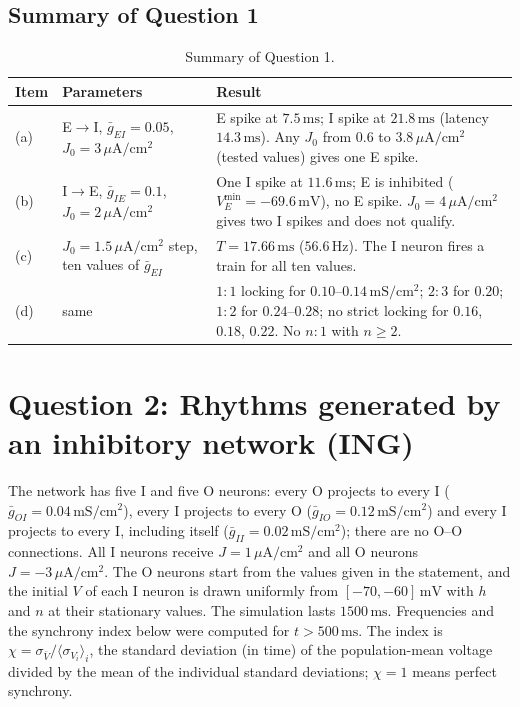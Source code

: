 \documentclass[12pt]{article}
\newcommand{\ms}{\,\mathrm{ms}}
\newcommand{\mV}{\,\mathrm{mV}}
\newcommand{\Hz}{\,\mathrm{Hz}}
\newcommand{\gu}{\,\mathrm{mS/cm^2}}
\newcommand{\Ju}{\,\mu\mathrm{A/cm^2}}
\begin{document}
\subsection*{Summary of Question 1}

\begin{table}[H]
\centering
\begin{tabular}{p{}p{}p{}}
\toprule
\textbf{Item} & \textbf{Parameters} & \textbf{Result}\\
\midrule
(a) & E$\to$I, $\bar g_{EI}=0.05$, $J_0=3\Ju$ & E spike at $7.5\ms$; I spike at $21.8\ms$ (latency $14.3\ms$). Any $J_0$ from $0.6$ to $3.8\Ju$ (tested values) gives one E spike.\\
(b) & I$\to$E, $\bar g_{IE}=0.1$, $J_0=2\Ju$ & One I spike at $11.6\ms$; E is inhibited ($V_E^{\min}=-69.6\mV$), no E spike. $J_0=4\Ju$ gives two I spikes and does not qualify.\\
(c) & $J_0=1.5\Ju$ step, ten values of $\bar g_{EI}$ & $T=17.66\ms$ ($56.6\Hz$). The I neuron fires a train for all ten values.\\
(d) & same & $1{:}1$ locking for $0.10$--$0.14\gu$; $2{:}3$ for $0.20$; $1{:}2$ for $0.24$--$0.28$; no strict locking for $0.16$, $0.18$, $0.22$. No $n{:}1$ with $n\ge2$.\\
\bottomrule
\end{tabular}
\caption{Summary of Question 1.}
\label{tab:q1summary}
\end{table}

\section*{Question 2: Rhythms generated by an inhibitory network (ING)}

The network has five I and five O neurons: every O projects to every I ($\bar g_{OI}=0.04\gu$), every I projects to every O ($\bar g_{IO}=0.12\gu$) and every I projects to every I, including itself ($\bar g_{II}=0.02\gu$); there are no O--O connections. All I neurons receive $J=1\Ju$ and all O neurons $J=-3\Ju$. The O neurons start from the values given in the statement, and the initial $V$ of each I neuron is drawn uniformly from $[-70,-60]\mV$ with $h$ and $n$ at their stationary values. The simulation lasts $1500\ms$. Frequencies and the synchrony index below were computed for $t>500\ms$. The index is $\chi=\sigma_{\bar V}/\langle\sigma_{V_i}\rangle_i$, the standard deviation (in time) of the population-mean voltage divided by the mean of the individual standard deviations; $\chi=1$ means perfect synchrony.
\end{document}
